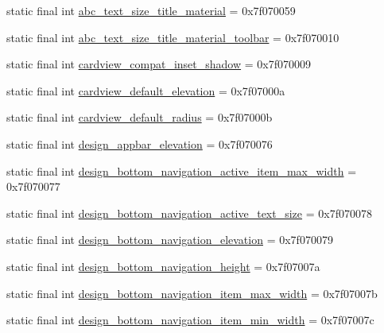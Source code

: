 \begin{CompactItemize}
\item 
static final int \hyperlink{classandroid_1_1support_1_1v4_1_1_r_1_1dimen_6848bc0c96fedc350c8d8302fa784bf0}{abc\_\-text\_\-size\_\-title\_\-material} = 0x7f070059
\item 
static final int \hyperlink{classandroid_1_1support_1_1v4_1_1_r_1_1dimen_df2cabd3411cfb5ec3769baf0a875670}{abc\_\-text\_\-size\_\-title\_\-material\_\-toolbar} = 0x7f070010
\item 
static final int \hyperlink{classandroid_1_1support_1_1v4_1_1_r_1_1dimen_09368d577a997f3d0cd112b8b7ecf8ce}{cardview\_\-compat\_\-inset\_\-shadow} = 0x7f070009
\item 
static final int \hyperlink{classandroid_1_1support_1_1v4_1_1_r_1_1dimen_8bf388774366f0c260e832149121b165}{cardview\_\-default\_\-elevation} = 0x7f07000a
\item 
static final int \hyperlink{classandroid_1_1support_1_1v4_1_1_r_1_1dimen_c9470c6568154002f19b28d154d0cc94}{cardview\_\-default\_\-radius} = 0x7f07000b
\item 
static final int \hyperlink{classandroid_1_1support_1_1v4_1_1_r_1_1dimen_7906470ec92428992e4dba219f442c8a}{design\_\-appbar\_\-elevation} = 0x7f070076
\item 
static final int \hyperlink{classandroid_1_1support_1_1v4_1_1_r_1_1dimen_71bcc02d008cb9af2a1fd41859998ac9}{design\_\-bottom\_\-navigation\_\-active\_\-item\_\-max\_\-width} = 0x7f070077
\item 
static final int \hyperlink{classandroid_1_1support_1_1v4_1_1_r_1_1dimen_c03b48086315532f10762d119e317ebf}{design\_\-bottom\_\-navigation\_\-active\_\-text\_\-size} = 0x7f070078
\item 
static final int \hyperlink{classandroid_1_1support_1_1v4_1_1_r_1_1dimen_4a84dea2ed044174c4789ebf1772e905}{design\_\-bottom\_\-navigation\_\-elevation} = 0x7f070079
\item 
static final int \hyperlink{classandroid_1_1support_1_1v4_1_1_r_1_1dimen_1586fae7f64909bc856569079d0f0dfe}{design\_\-bottom\_\-navigation\_\-height} = 0x7f07007a
\item 
static final int \hyperlink{classandroid_1_1support_1_1v4_1_1_r_1_1dimen_74b63b299a82caf8bef387f58f64d40d}{design\_\-bottom\_\-navigation\_\-item\_\-max\_\-width} = 0x7f07007b
\item 
static final int \hyperlink{classandroid_1_1support_1_1v4_1_1_r_1_1dimen_1b8a6792dc02359541ded041c6f7350c}{design\_\-bottom\_\-navigation\_\-item\_\-min\_\-width} = 0x7f07007c
\item 

\end{CompactItemize}
